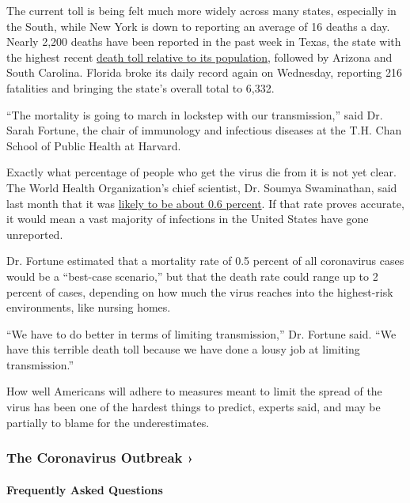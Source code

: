 The current toll is being felt much more widely across many states,
especially in the South, while New York is down to reporting an average
of 16 deaths a day. Nearly 2,200 deaths have been reported in the past
week in Texas, the state with the highest recent
\href{https://www.nytimes.com/interactive/2020/us/coronavirus-us-cases.html}{death
toll relative to its population}, followed by Arizona and South
Carolina. Florida broke its daily record again on Wednesday, reporting
216 fatalities and bringing the state's overall total to 6,332.

``The mortality is going to march in lockstep with our transmission,''
said Dr. Sarah Fortune, the chair of immunology and infectious diseases
at the T.H. Chan School of Public Health at Harvard.

Exactly what percentage of people who get the virus die from it is not
yet clear. The World Health Organization's chief scientist, Dr. Soumya
Swaminathan, said last month that it was
\href{https://www.nytimes.com/2020/07/04/health/coronavirus-death-rate.html}{likely
to be about 0.6 percent}. If that rate proves accurate, it would mean a
vast majority of infections in the United States have gone unreported.

Dr. Fortune estimated that a mortality rate of 0.5 percent of all
coronavirus cases would be a ``best-case scenario,'' but that the death
rate could range up to 2 percent of cases, depending on how much the
virus reaches into the highest-risk environments, like nursing homes.

``We have to do better in terms of limiting transmission,'' Dr. Fortune
said. ``We have this terrible death toll because we have done a lousy
job at limiting transmission.''

How well Americans will adhere to measures meant to limit the spread of
the virus has been one of the hardest things to predict, experts said,
and may be partially to blame for the underestimates.

\href{https://www.nytimes.com/news-event/coronavirus?action=click\&pgtype=Article\&state=default\&region=MAIN_CONTENT_3\&context=storylines_faq}{}

\hypertarget{the-coronavirus-outbreak-}{%
\subsubsection{The Coronavirus Outbreak
›}\label{the-coronavirus-outbreak-}}

\hypertarget{frequently-asked-questions}{%
\paragraph{Frequently Asked
Questions}\label{frequently-asked-questions}}

